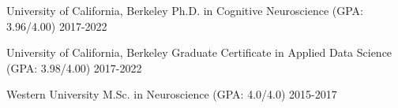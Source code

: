 
\begin{cvhonors}

 \cvhonor
    {University of California, Berkeley} %
    {Ph.D. in Cognitive Neuroscience (GPA: 3.96/4.00)}
    {} %
  	{2017-2022}
  	
 \cvhonor
    {University of California, Berkeley} %
    {Graduate Certificate in Applied Data Science (GPA: 3.98/4.00)}
    {} %
  	{2017-2022}
  	
 \cvhonor
    {Western University} %
    {M.Sc. in  Neuroscience (GPA: 4.0/4.0)}
    {} %
  	{2015-2017}
  	
\end{cvhonors}



    
   
